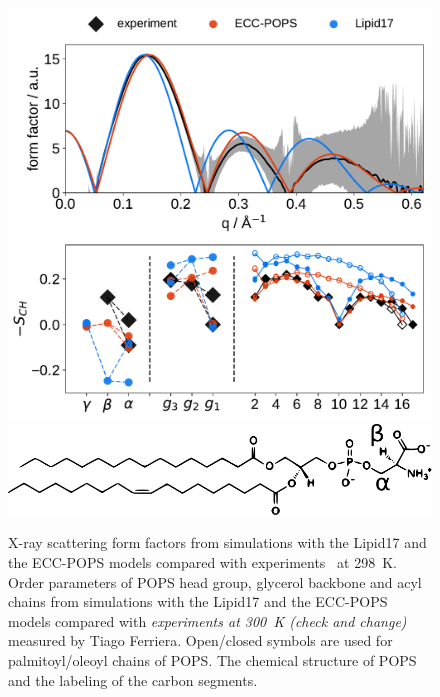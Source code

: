 \begin{figure}[tb!] 
  \centering 
  \includegraphics[width=\figwidth]{../img/ecc_pops/Order-parameters_form-factors_exp-L17-ECC-lipids.pdf}
  \includegraphics[width=\figwidth]{../img/ecc_pops/pops_chemfig.pdf} 
\hfill
  \caption{\label{simVSexpNOions_POPS} 
    X-ray scattering form factors from simulations with the Lipid17 \citep{lipid17-future} and 
    the ECC-POPS models compared with experiments~\citep{kucerka11} at 298~K. 
    Order parameters of POPS head group, glycerol backbone and acyl chains  
    from simulations with the Lipid17 \citep{lipid17-future} and the ECC-POPS models 
    compared with \emph{experiments at 300~K (check and change)} measured by Tiago Ferriera. 
    Open/closed symbols are used for palmitoyl/oleoyl chains of POPS. 
    The chemical structure of POPS and the labeling of the carbon segments. 
  }  
\end{figure} 
 
